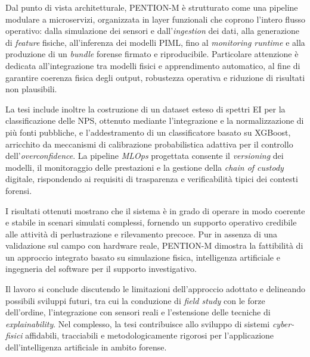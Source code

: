 \documentclass[a4paper, 12pt, oneside]{book}
\begin{document}
Dal punto di vista architetturale, \textsc{PENTION-M} è strutturato come una pipeline modulare a microservizi, organizzata in layer funzionali che coprono l’intero flusso operativo: dalla simulazione dei sensori e dall’\textit{ingestion} dei dati, alla generazione di \textit{feature} fisiche, all’inferenza dei modelli PIML, fino al \textit{monitoring runtime} e alla produzione di un \textit{bundle} forense firmato e riproducibile. Particolare attenzione è dedicata all’integrazione tra modelli fisici e apprendimento automatico, al fine di garantire coerenza fisica degli output, robustezza operativa e riduzione di risultati non plausibili.

La tesi include inoltre la costruzione di un dataset esteso di spettri EI per la classificazione delle NPS, ottenuto mediante l’integrazione e la normalizzazione di più fonti pubbliche, e l’addestramento di un classificatore basato su XGBoost, arricchito da meccanismi di calibrazione probabilistica adattiva per il controllo dell’\textit{overconfidence}. La pipeline \textit{MLOps} progettata consente il \textit{versioning} dei modelli, il monitoraggio delle prestazioni e la gestione della \textit{chain of custody} digitale, rispondendo ai requisiti di trasparenza e verificabilità tipici dei contesti forensi.

I risultati ottenuti mostrano che il sistema è in grado di operare in modo coerente e stabile in scenari simulati complessi, fornendo un supporto operativo credibile alle attività di perlustrazione e rilevamento precoce. Pur in assenza di una validazione sul campo con hardware reale, \textsc{PENTION-M} dimostra la fattibilità di un approccio integrato basato su simulazione fisica, intelligenza artificiale e ingegneria del software per il supporto investigativo.

Il lavoro si conclude discutendo le limitazioni dell’approccio adottato e delineando possibili sviluppi futuri, tra cui la conduzione di \textit{field study} con le forze dell’ordine, l’integrazione con sensori reali e l’estensione delle tecniche di \textit{explainability}. Nel complesso, la tesi contribuisce allo sviluppo di sistemi \textit{cyber-fisici} affidabili, tracciabili e metodologicamente rigorosi per l’applicazione dell’intelligenza artificiale in ambito forense.
\clearpage

\tableofcontents
\clearpage

\mainmatter

\sloppy
{}









\backmatter

\printbibliography[
	heading=bibintoc,
	title={Bibliografia}
]

\listoffigures
{}

\listoftables
{}


\end{document}
